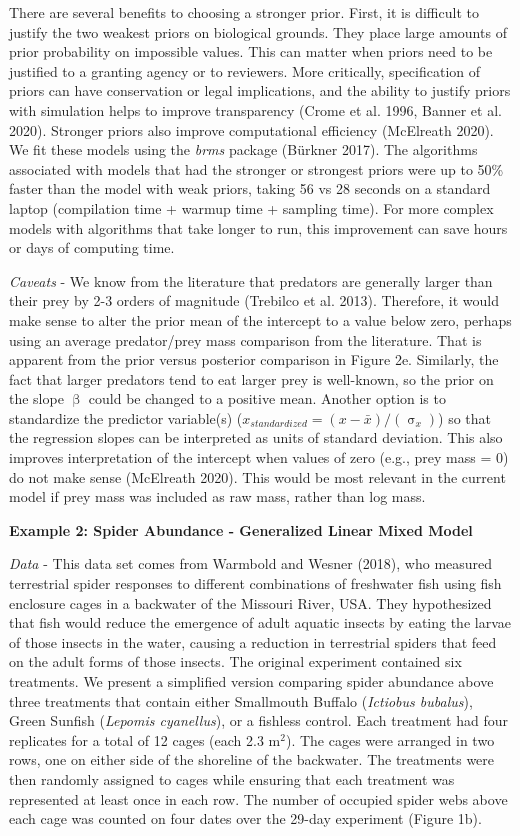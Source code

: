 \documentclass[
  12pt,
]{article}
\begin{document}
There are several benefits to choosing a stronger prior. First, it is
difficult to justify the two weakest priors on biological grounds. They
place large amounts of prior probability on impossible values. This can
matter when priors need to be justified to a granting agency or to
reviewers. More critically, specification of priors can have
conservation or legal implications, and the ability to justify priors
with simulation helps to improve transparency (Crome et al. 1996, Banner
et al. 2020). Stronger priors also improve computational efficiency
(McElreath 2020). We fit these models using the \emph{brms} package
(Bürkner 2017). The algorithms associated with models that had the
stronger or strongest priors were up to 50\% faster than the model with
weak priors, taking 56 vs 28 seconds on a standard laptop (compilation
time + warmup time + sampling time). For more complex models with
algorithms that take longer to run, this improvement can save hours or
days of computing time.

\emph{Caveats} - We know from the literature that predators are
generally larger than their prey by 2-3 orders of magnitude (Trebilco et
al. 2013). Therefore, it would make sense to alter the prior mean of the
intercept to a value below zero, perhaps using an average predator/prey
mass comparison from the literature. That is apparent from the prior
versus posterior comparison in Figure 2e. Similarly, the fact that
larger predators tend to eat larger prey is well-known, so the prior on
the slope \(\upbeta\) could be changed to a positive mean. Another
option is to standardize the predictor variable(s)
(\(x_{standardized} = ({x-\bar{x}})/({\upsigma_{x}})\)) so that the
regression slopes can be interpreted as units of standard deviation.
This also improves interpretation of the intercept when values of zero
(e.g., prey mass = 0) do not make sense (McElreath 2020). This would be
most relevant in the current model if prey mass was included as raw
mass, rather than log mass.

\textbf{Example 2: Spider Abundance - Generalized Linear Mixed Model}

\emph{Data} - This data set comes from Warmbold and Wesner (2018), who
measured terrestrial spider responses to different combinations of
freshwater fish using fish enclosure cages in a backwater of the
Missouri River, USA. They hypothesized that fish would reduce the
emergence of adult aquatic insects by eating the larvae of those insects
in the water, causing a reduction in terrestrial spiders that feed on
the adult forms of those insects. The original experiment contained six
treatments. We present a simplified version comparing spider abundance
above three treatments that contain either Smallmouth Buffalo
(\emph{Ictiobus bubalus}), Green Sunfish (\emph{Lepomis cyanellus}), or
a fishless control. Each treatment had four replicates for a total of 12
cages (each 2.3 m\(^2\)). The cages were arranged in two rows, one on
either side of the shoreline of the backwater. The treatments were then
randomly assigned to cages while ensuring that each treatment was
represented at least once in each row. The number of occupied spider
webs above each cage was counted on four dates over the 29-day
experiment (Figure 1b).
\end{document}

